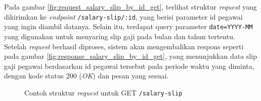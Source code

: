 Pada gambar \ref{fig:request_salary_slip_by_id_get}, terlihat struktur \textit{request} yang dikirimkan ke \textit{endpoint} \texttt{/salary-slip/{:id}}, yang berisi parameter id pegawai yang ingin diambil datanya. Selain itu, terdapat query parameter \texttt{date=YYYY-MM} yang digunakan untuk menyaring slip gaji pada bulan dan tahun tertentu. Setelah \textit{request} berhasil diproses, sistem akan mengembalikan respons seperti pada gambar \ref{fig:response_salary_slip_by_id_get}, yang menunjukkan data slip gaji pegawai berdasarkan id pegawai tersebut pada periode waktu yang diminta, dengan kode status 200 (\textit{OK}) dan pesan yang sesuai.


\begin{figure}
    \centering
    \caption{Contoh struktur \textit{request} untuk GET \texttt{/salary-slip}}
    \label{fig:request_salary_slip_get}
\end{figure}
